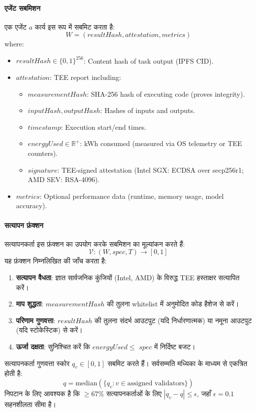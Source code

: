 \documentclass[11pt]{article}
\begin{document}
\begin{itemize}[noitemsep]
\begin{itemize}[noitemsep]
\paragraph{एजेंट सबमिशन} एक एजेंट $a$ कार्य इस रूप में सबमिट करता है:
\begin{equation}
W = (resultHash, attestation, metrics)
\end{equation}
where:
\begin{itemize}[noitemsep]
  \item $resultHash \in \{0,1\}^{256}$: Content hash of task output (IPFS CID).
  \item $attestation$: TEE report including:
    \begin{itemize}[noitemsep]
      \item $measurementHash$: SHA-256 hash of executing code (proves integrity).
      \item $inputHash, outputHash$: Hashes of inputs and outputs.
      \item $timestamp$: Execution start/end times.
      \item $energyUsed \in \mathbb{R}^+$: kWh consumed (measured via OS telemetry or TEE counters).
      \item $signature$: TEE-signed attestation (Intel SGX: ECDSA over secp256r1; AMD SEV: RSA-4096).
    \end{itemize}
  \item $metrics$: Optional performance data (runtime, memory usage, model accuracy).
\end{itemize}

\paragraph{सत्यापन फ़ंक्शन} सत्यापनकर्ता इस फ़ंक्शन का उपयोग करके सबमिशन का मूल्यांकन करते हैं:
\begin{equation}
\mathcal{V}: (W, spec, T) \rightarrow [0, 1]
\end{equation}
यह फ़ंक्शन निम्नलिखित की जाँच करता है:
\begin{enumerate}[noitemsep]
  \item \textbf{सत्यापन वैधता}: ज्ञात सार्वजनिक कुंजियों (Intel, AMD) के विरुद्ध TEE हस्ताक्षर सत्यापित करें।
  \item \textbf{माप शुद्धता}: $measurementHash$ की तुलना whitelist में अनुमोदित कोड हैशेज से करें।
  \item \textbf{परिणाम गुणवत्ता}: $resultHash$ की तुलना संदर्भ आउटपुट (यदि निर्धारणात्मक) या नमूना आउटपुट (यदि स्टोकेस्टिक) से करें।
  \item \textbf{ऊर्जा दक्षता}: सुनिश्चित करें कि $energyUsed \leq$ $spec$ में निर्दिष्ट बजट।
\end{enumerate}
सत्यापनकर्ता गुणवत्ता स्कोर $q_v \in [0,1]$ सबमिट करते हैं। सर्वसम्मति मध्यिका के माध्यम से एकत्रित होती है:
\begin{equation}
q = \text{median}(\{q_v : v \in \text{assigned validators}\})
\end{equation}
निपटान के लिए आवश्यक है कि $\geq 67\%$ सत्यापनकर्ताओं के लिए $|q_v - q| \leq \epsilon$, जहाँ $\epsilon = 0.1$ सहनशीलता सीमा है।


\end{itemize}
\end{itemize}
\end{document}
